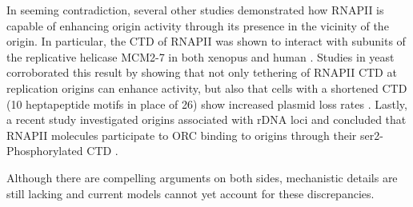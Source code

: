 In seeming contradiction, several other studies demonstrated how RNAPII is capable of enhancing origin activity through its presence in the vicinity of the origin. 
In particular, the CTD of RNAPII was shown to interact with subunits of the replicative helicase MCM2-7 in both xenopus and human \cite{yankulov:1999:mcm}. 
Studies in yeast corroborated this result by showing that not only tethering of RNAPII CTD at replication origins can enhance activity, but also that cells with a shortened CTD (10 heptapeptide motifs in place of 26) show increased plasmid loss rates \cite{gauthier:2002:role}. 
Lastly, a recent study investigated origins associated with rDNA loci and concluded that RNAPII molecules participate to ORC binding to origins through their  ser2-Phosphorylated CTD \cite{mayan:2013:rnapii}. 


Although there are compelling arguments on both sides, mechanistic details are still lacking and current models cannot yet account for these discrepancies.










